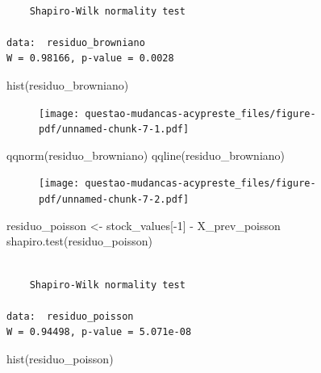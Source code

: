 \documentclass[
  letterpaper,
  DIV=11,
  numbers=noendperiod]{scrreprt}
\newenvironment{Shaded}{\begin{snugshade}}{\end{snugshade}}
\newcommand{\DecValTok}[1]{\textcolor[rgb]{0.68,0.00,0.00}{#1}}
\newcommand{\FunctionTok}[1]{\textcolor[rgb]{0.28,0.35,0.67}{#1}}
\newcommand{\NormalTok}[1]{\textcolor[rgb]{0.00,0.23,0.31}{#1}}
\newcommand{\OtherTok}[1]{\textcolor[rgb]{0.00,0.23,0.31}{#1}}
\newcommand{\SpecialCharTok}[1]{\textcolor[rgb]{0.37,0.37,0.37}{#1}}
\begin{document}
\begin{verbatim}

    Shapiro-Wilk normality test

data:  residuo_browniano
W = 0.98166, p-value = 0.0028
\end{verbatim}

\begin{Shaded}
\begin{Highlighting}[]
\FunctionTok{hist}\NormalTok{(residuo\_browniano)}
\end{Highlighting}
\end{Shaded}

\begin{figure}[H]

{\centering \texttt{[image: questao-mudancas-acypreste\_files/figure-pdf/unnamed-chunk-7-1.pdf]}

}

\end{figure}

\begin{Shaded}
\begin{Highlighting}[]
\FunctionTok{qqnorm}\NormalTok{(residuo\_browniano)}
\FunctionTok{qqline}\NormalTok{(residuo\_browniano)}
\end{Highlighting}
\end{Shaded}

\begin{figure}[H]

{\centering \texttt{[image: questao-mudancas-acypreste\_files/figure-pdf/unnamed-chunk-7-2.pdf]}

}

\end{figure}

\begin{Shaded}
\begin{Highlighting}[]
\NormalTok{residuo\_poisson }\OtherTok{\textless{}{-}}\NormalTok{ stock\_values[}\SpecialCharTok{{-}}\DecValTok{1}\NormalTok{] }\SpecialCharTok{{-}}\NormalTok{ X\_prev\_poisson}
\FunctionTok{shapiro.test}\NormalTok{(residuo\_poisson)}
\end{Highlighting}
\end{Shaded}

\begin{verbatim}

    Shapiro-Wilk normality test

data:  residuo_poisson
W = 0.94498, p-value = 5.071e-08
\end{verbatim}

\begin{Shaded}
\begin{Highlighting}[]
\FunctionTok{hist}\NormalTok{(residuo\_poisson)}
\end{Highlighting}
\end{Shaded}
\end{document}
